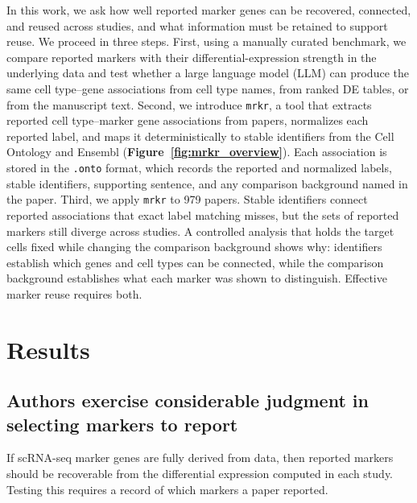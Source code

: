 \documentclass[10pt,twocolumn]{article}
\theoremstyle{plain}
\theoremstyle{definition}
\theoremstyle{remark}
\begin{document}
In this work, we ask how well reported marker genes can be recovered, connected, and reused across studies, and what information must be retained to support reuse. We proceed in three steps. First, using a manually curated benchmark, we compare reported markers with their differential-expression strength in the underlying data and test whether a large language model (LLM) can produce the same cell type--gene associations from cell type names, from ranked DE tables, or from the manuscript text. Second, we introduce \texttt{mrkr}, a tool that extracts reported cell type--marker gene associations from papers, normalizes each reported label, and maps it deterministically to stable identifiers from the Cell Ontology and Ensembl (\textbf{Figure~\ref{fig:mrkr_overview}}). Each association is stored in the \texttt{.onto} format, which records the reported and normalized labels, stable identifiers, supporting sentence, and any comparison background named in the paper. Third, we apply \texttt{mrkr} to 979 papers. Stable identifiers connect reported associations that exact label matching misses, but the sets of reported markers still diverge across studies. A controlled analysis that holds the target cells fixed while changing the comparison background shows why: identifiers establish which genes and cell types can be connected, while the comparison background establishes what each marker was shown to distinguish. Effective marker reuse requires both.


\section{Results}
\subsection*{Authors exercise considerable judgment in selecting markers to report}

If scRNA-seq marker genes are fully derived from data, then reported markers should be recoverable from the differential expression computed in each study. Testing this requires a record of which markers a paper reported.  
\end{document}
